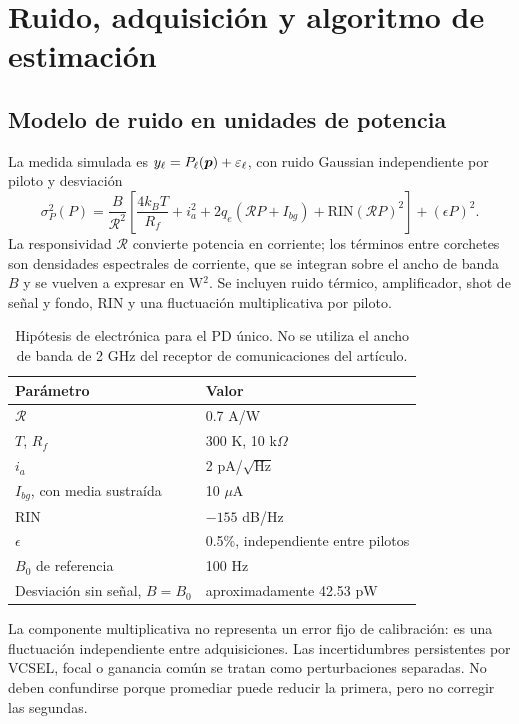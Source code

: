 \section{Ruido, adquisición y algoritmo de estimación}
\subsection{Modelo de ruido en unidades de potencia}
La medida simulada es $y_\ell=P_\ell(\bm{p})+\varepsilon_\ell$, con ruido Gaussian independiente por piloto y desviación
\begin{equation}\label{eq:noise}
\sigma_P^2(P)=\frac{B}{\mathcal R^2}\left[
\frac{4k_BT}{R_f}+i_a^2+2q_e(\mathcal RP+I_{bg})+
\mathrm{RIN}(\mathcal RP)^2\right]+(\epsilon P)^2.
\end{equation}
La responsividad $\mathcal R$ convierte potencia en corriente; los términos entre corchetes son densidades espectrales de corriente, que se integran sobre el ancho de banda $B$ y se vuelven a expresar en W$^2$. Se incluyen ruido térmico, amplificador, shot de señal y fondo, RIN y una fluctuación multiplicativa por piloto.

\begin{table}[H]\centering\begin{tabular}{ll}\toprule
Parámetro & Valor\\\midrule
$\mathcal R$ & 0.7 A/W\\
$T$, $R_f$ & 300 K, 10 k$\Omega$\\
$i_a$ & 2 pA/$\sqrt{\mathrm{Hz}}$\\
$I_{bg}$, con media sustraída & 10 $\mu$A\\
RIN & $-155$ dB/Hz\\
$\epsilon$ & 0.5\%, independiente entre pilotos\\
$B_0$ de referencia & 100 Hz\\
Desviación sin señal, $B=B_0$ & aproximadamente 42.53 pW\\\bottomrule
\end{tabular}\caption{Hipótesis de electrónica para el PD único. No se utiliza el ancho de banda de 2 GHz del receptor de comunicaciones del artículo.}\end{table}

La componente multiplicativa no representa un error fijo de calibración: es una fluctuación independiente entre adquisiciones. Las incertidumbres persistentes por VCSEL, focal o ganancia común se tratan como perturbaciones separadas. No deben confundirse porque promediar puede reducir la primera, pero no corregir las segundas.

